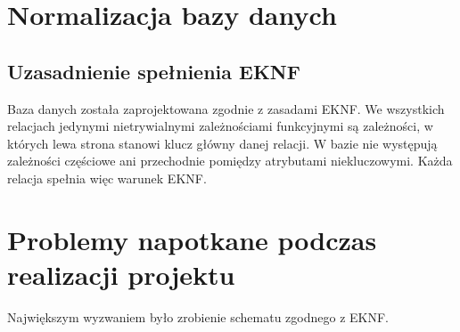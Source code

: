 \documentclass{article}
\begin{document}
\section{Normalizacja bazy danych}
\subsection{Uzasadnienie spełnienia EKNF}
Baza danych została zaprojektowana zgodnie z zasadami EKNF.
We wszystkich relacjach jedynymi nietrywialnymi zależnościami funkcyjnymi są zależności,
w których lewa strona stanowi klucz główny danej relacji.
W bazie nie występują zależności częściowe ani przechodnie pomiędzy atrybutami niekluczowymi.
Każda relacja spełnia więc warunek EKNF.

\section{Problemy napotkane podczas realizacji projektu}
Największym wyzwaniem było zrobienie schematu zgodnego z EKNF.
\end{document}
